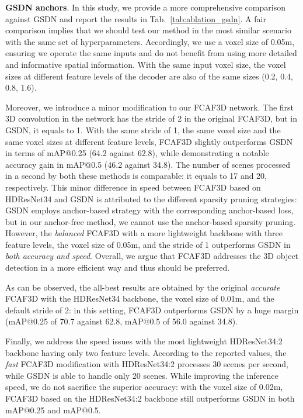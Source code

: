 \documentclass[runningheads]{llncs}
\begin{document}
\textbf{GSDN anchors}. In this study, we provide a more comprehensive comparison against GSDN and report the results in Tab.~\ref{tab:ablation_gsdn}. A fair comparison implies that we should test our method in the most similar scenario with the same set of hyperparameters. Accordingly, we use a voxel size of 0.05m, ensuring we operate the same inputs and do not benefit from using more detailed and informative spatial information. With the same input voxel size, the voxel sizes at different feature levels of the decoder are also of the same sizes (0.2, 0.4, 0.8, 1.6). 

Moreover, we introduce a minor modification to our FCAF3D network. The first 3D convolution in the network has the stride of 2 in the original FCAF3D, but in GSDN, it equals to 1. With the same stride of 1, the same voxel size and the same voxel sizes at different feature levels, FCAF3D slightly outperforms GSDN in terms of mAP@0.25 (64.2 against 62.8), while demonstrating a notable accuracy gain in mAP@0.5 (46.2 against 34.8). The number of scenes processed in a second by both these methods is comparable: it equals to 17 and 20, respectively. This minor difference in speed between FCAF3D based on HDResNet34 and GSDN is attributed to the different sparsity pruning strategies: GSDN employs anchor-based strategy with the corresponding anchor-based loss, but in our anchor-free method, we cannot use the anchor-based sparsity pruning. However, the \textit{balanced} FCAF3D with a more lightweight backbone with three feature levels, the voxel size of 0.05m, and the stride of 1 outperforms GSDN in \emph{both accuracy and speed}. Overall, we argue that FCAF3D addresses the 3D object detection in a more efficient way and thus should be preferred.

As can be observed, the all-best results are obtained by the original \textit{accurate} FCAF3D with the HDResNet34 backbone, the voxel size of 0.01m, and the default stride of 2: in this setting, FCAF3D outperforms GSDN by a huge margin (mAP@0.25 of 70.7 against 62.8, mAP@0.5 of 56.0 against 34.8).

Finally, we address the speed issues with the most lightweight HDResNet34:2 backbone having only two feature levels. %
According to the reported values, the \textit{fast} FCAF3D modification with HDResNet34:2 processes 30 scenes per second, while GSDN is able to handle only 20 scenes. While improving the inference speed, we do not sacrifice the superior accuracy: with the voxel size of 0.02m, FCAF3D based on the HDResNet34:2 backbone still outperforms GSDN in both mAP@0.25 and mAP@0.5.
\end{document}
